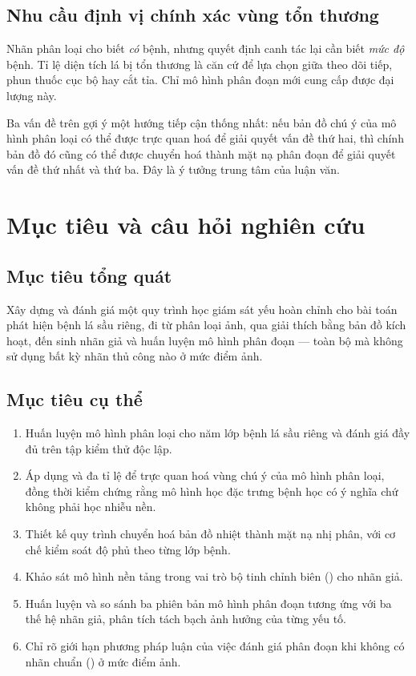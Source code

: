 \subsection{Nhu cầu định vị chính xác vùng tổn thương}

Nhãn phân loại cho biết \emph{có} bệnh, nhưng quyết định canh tác lại cần biết
\emph{mức độ} bệnh. Tỉ lệ diện tích lá bị tổn thương là căn cứ để lựa chọn giữa
theo dõi tiếp, phun thuốc cục bộ hay cắt tỉa. Chỉ mô hình phân đoạn mới cung cấp
được đại lượng này.

Ba vấn đề trên gợi ý một hướng tiếp cận thống nhất: nếu bản đồ chú ý của mô hình
phân loại có thể được trực quan hoá để giải quyết vấn đề thứ hai, thì chính bản
đồ đó cũng có thể được chuyển hoá thành mặt nạ phân đoạn để giải quyết vấn đề thứ
nhất và thứ ba. Đây là ý tưởng trung tâm của luận văn.

\section{Mục tiêu và câu hỏi nghiên cứu}
\label{sec:muctieu}

\subsection{Mục tiêu tổng quát}

Xây dựng và đánh giá một quy trình học giám sát yếu hoàn chỉnh cho bài toán phát
hiện bệnh lá sầu riêng, đi từ phân loại ảnh, qua giải thích bằng bản đồ kích
hoạt, đến sinh nhãn giả và huấn luyện mô hình phân đoạn --- toàn bộ mà không sử
dụng bất kỳ nhãn thủ công nào ở mức điểm ảnh.

\subsection{Mục tiêu cụ thể}

\begin{enumerate}
    \item Huấn luyện mô hình phân loại \EffNet{} cho năm lớp bệnh lá sầu riêng và
          đánh giá đầy đủ trên tập kiểm thử độc lập.
    \item Áp dụng \GradCAM{} và \GradCAMpp{} đa tỉ lệ để trực quan hoá vùng chú ý
          của mô hình phân loại, đồng thời kiểm chứng rằng mô hình học đặc trưng
          bệnh học có ý nghĩa chứ không phải học nhiễu nền.
    \item Thiết kế quy trình chuyển hoá bản đồ nhiệt thành mặt nạ nhị phân, với
          cơ chế kiểm soát độ phủ theo từng lớp bệnh.
    \item Khảo sát mô hình nền tảng \SAM{} trong vai trò bộ tinh chỉnh biên
          () cho nhãn giả.
    \item Huấn luyện và so sánh ba phiên bản mô hình phân đoạn tương ứng với ba
          thế hệ nhãn giả, phân tích tách bạch ảnh hưởng của từng yếu tố.
    \item Chỉ rõ giới hạn phương pháp luận của việc đánh giá phân đoạn khi không
          có nhãn chuẩn () ở mức điểm ảnh.
\end{enumerate}

